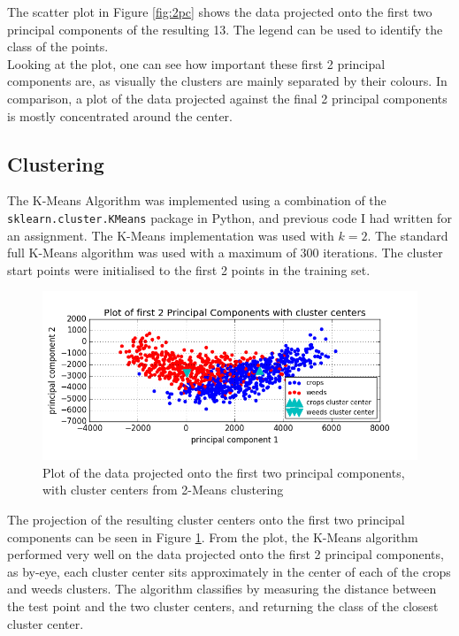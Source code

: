 \documentclass{scrartcl}
\begin{document}
The scatter plot in Figure \ref{fig:2pc} shows the data projected onto the first two principal components of the resulting 13. The legend can be used to identify the class of the points. \\

Looking at the plot, one can see how important these first 2 principal components are, as visually the clusters are mainly separated by their colours. In comparison, a plot of the data projected against the final 2 principal components is mostly concentrated around the center. \\

\subsection{Clustering}

The K-Means Algorithm was implemented using a combination of the\\ \texttt{sklearn.cluster.KMeans} package in Python, and previous code I had written for an assignment. The K-Means implementation was used with $k = 2$. The standard full K-Means algorithm was used with a maximum of 300 iterations. The cluster start points were initialised to the first 2 points in the training set.\\

\begin{figure}[h]
\includegraphics[width=16cm]{2pc_cc.png}
\caption{Plot of the data projected onto the first two principal components, with cluster centers from 2-Means clustering}
\label{fig:2pc_cc}
\end{figure}

The projection of the resulting cluster centers onto the first two principal components can be seen in Figure \ref{fig:2pc_cc}. From the plot, the K-Means algorithm performed very well on the data projected onto the first 2 principal components, as by-eye, each cluster center sits approximately in the center of each of the crops and weeds clusters. The algorithm classifies by measuring the distance between the test point and the two cluster centers, and returning the class of the closest cluster center. \\
\end{document}
